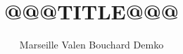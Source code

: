 \documentclass[11pt]{article} %
\title{@@@TITLE@@@}
\author{Marseille Valen Bouchard Demko}
\theoremstyle{definition}
\theoremstyle{remark}
\begin{document}
\maketitle
\begin{abstract}
\end{abstract}

\printbibliography
\end{document}

